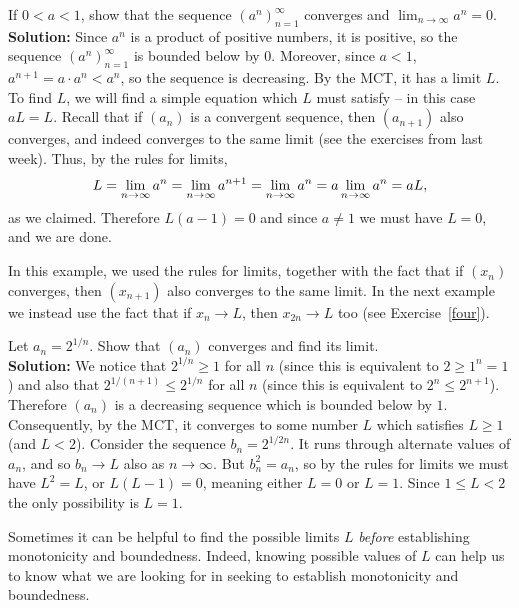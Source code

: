 \documentclass[11pt,dvipsnames]{book}
\numberwithin{equation}{section} %
\numberwithin{figure}{section} %
\numberwithin{table}{section} %
\begin{document}
\begin{example}
\label{ex:power}
If $0<a<1$, show that the sequence $(a^n)_{n=1}^\infty$ converges and $\lim_{n\rightarrow\infty} a^{n}=0$. \\

\noindent
{\bf Solution:} Since $a^n$ is a product of positive numbers, it is positive, so the sequence $(a^{n})_{n=1}^{\infty}$ is bounded below by $0$. Moreover, since $a<1$, $a^{n+1}=a\cdot a^{n}<a^{n}$, so the sequence is decreasing. By the MCT, it has a limit $L$. To find $L$, we will find a simple equation which $L$ must satisfy -- in this case $aL = L$. Recall that if $(a_{n})$ is a convergent sequence, then $(a_{n+1})$ also converges, and indeed converges to the same limit (see the exercises from last week). Thus, by the rules for limits,
\[
L=\lim_{n\rightarrow\infty} a^{n} = \lim_{n\rightarrow\infty} a^{n+1}=\lim_{n\rightarrow\infty} a^{n} =a\lim_{n\rightarrow\infty} a^{n}=aL,\]
as we claimed. Therefore $L(a-1) =0$ and since $a \neq 1$ we must have $L =0$, and we are done.
\end{example}
In this example, we used the rules for limits, together with the fact that if $(x_n)$ converges, then $(x_{n+1})$
also converges to the same limit. In the next example we instead use the fact that if $x_n \to L$, then $x_{2n} \to L$ too (see Exercise~\ref{four}).

\begin{example}\label{2^{1/n}}
Let $a_n = 2^{1/n}$. Show that $(a_n)$ converges and find its limit.\\

\noindent
{\bf Solution:} We notice that $2^{1/n} \geq 1$ for all $n$ (since this is equivalent to $2 \geq 1^n = 1$) and also that $2^{1/(n+1)} \leq 2^{1/n}$
for all $n$ (since this is equivalent to 
$2^n \leq 2^{n+1}$). Therefore $(a_n)$ is a decreasing sequence which is bounded below by $1$. Consequently, by the MCT, it converges to some number $L$ which satisfies $L\geq1$ (and $L< 2$). %
Consider the sequence $b_n = 2^{1/2n}$. It runs through alternate values of $a_n$, and so $b_n \to L$ also as $n \to \infty$. But $b_n^2 = a_n$, so by the rules for limits we must have $L^2 = L$, or $L(L-1) =0$, meaning either $L=0$ or $L=1$. Since $1 \leq L < 2$ the only possibility is $L = 1$.
\end{example}
Sometimes it can be helpful to find the possible limits $L$ {\em before}
establishing monotonicity and boundedness. Indeed, knowing possible values of $L$ can help us to know what we are looking for in seeking to establish monotonicity and boundedness.
\end{document}
